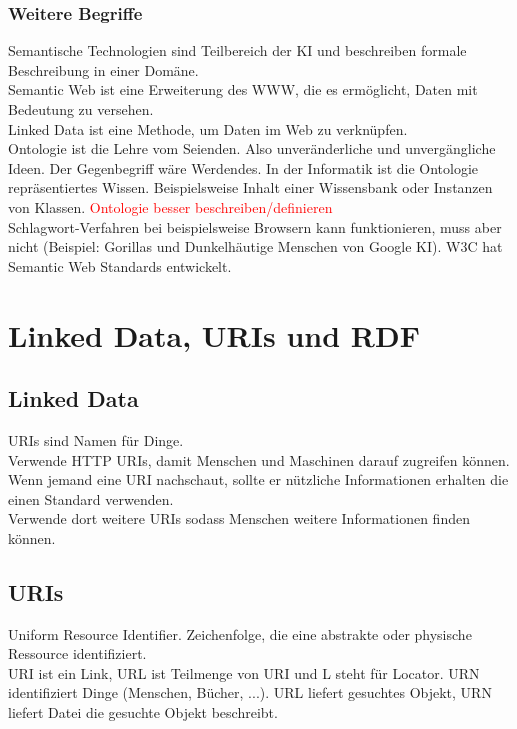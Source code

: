 \documentclass[12pt,a4paper]{article}
\begin{document}
		\subsubsection{Weitere Begriffe}
			Semantische Technologien sind Teilbereich der KI und beschreiben formale Beschreibung in einer Domäne.\\
			Semantic Web ist eine Erweiterung des WWW, die es ermöglicht, Daten mit Bedeutung zu versehen.\\
			Linked Data ist eine Methode, um Daten im Web zu verknüpfen.\\
			Ontologie ist die Lehre vom \glqq Seienden\grqq. Also unveränderliche und unvergängliche Ideen. Der Gegenbegriff wäre \glqq Werdendes\grqq. In der Informatik ist die Ontologie repräsentiertes Wissen. Beispielsweise Inhalt einer Wissensbank oder Instanzen von Klassen. \textcolor{red}{Ontologie besser beschreiben/definieren}\\
			Schlagwort-Verfahren bei beispielsweise Browsern kann funktionieren, muss aber nicht (Beispiel: Gorillas und Dunkelhäutige Menschen von Google KI). W3C hat Semantic Web Standards entwickelt.
		
	\section{Linked Data, URIs und RDF}
		\subsection{Linked Data}
			URIs sind Namen für Dinge.\\
			Verwende HTTP URIs, damit Menschen und Maschinen darauf zugreifen können.\\
			Wenn jemand eine URI nachschaut, sollte er nützliche Informationen erhalten die einen Standard verwenden.\\
			Verwende dort weitere URIs sodass Menschen weitere Informationen finden können.

		\subsection{URIs}
			Uniform Resource Identifier. Zeichenfolge, die eine abstrakte oder physische Ressource identifiziert.\\ URI ist ein Link, URL ist Teilmenge von URI und L steht für Locator. URN identifiziert Dinge (Menschen, Bücher, ...). URL liefert gesuchtes Objekt, URN liefert Datei die gesuchte Objekt beschreibt.
\end{document}
